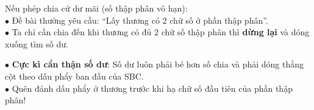 \documentclass[14pt,a4paper,oneside]{extbook}
\begin{document}
\noindent
\begin{minipage}[t]{0.54\textwidth}
  \begin{tcolorbox}[
    enhanced,
    title={\footnotesize\bfseries\color{white}\faRepeat\ Phép chia không bao giờ hết},
    colback=green!3!white,
    colframe=green!60!black,
    arc=2.5mm, boxrule=0.8pt, top=1.8mm, bottom=1.8mm, left=2.2mm, right=2.2mm
  ]
    \footnotesize
    Nếu phép chia cứ dư mãi (số thập phân vô hạn):\\
    $\bullet$ Đề bài thường yêu cầu: ``Lấy thương có $2$ chữ số ở phần thập phân''.\\
    $\bullet$ Ta chỉ cần chia đến khi thương có đủ $2$ chữ số thập phân thì \textbf{dừng lại} và dóng xuống tìm số dư.
  \end{tcolorbox}
\end{minipage}%
\hfill
\begin{minipage}[t]{0.44\textwidth}
  \begin{tcolorbox}[
    enhanced,
    title={\footnotesize\bfseries\color{white}\faExclamationTriangle\ Mẹo tránh bẫy trắc nghiệm},
    colback=red!2!white,
    colframe=red!70!black,
    arc=2.5mm, boxrule=0.8pt, top=1.8mm, bottom=1.8mm, left=2.2mm, right=2.2mm
  ]
    \footnotesize
    $\bullet$ \textbf{Cực kì cẩn thận số dư}: Số dư luôn phải bé hơn số chia và phải dóng thẳng cột theo dấu phẩy ban đầu của SBC.\\
    $\bullet$ Quên đánh dấu phẩy ở thương trước khi hạ chữ số đầu tiên của phần thập phân!
  \end{tcolorbox}
\end{minipage}
\end{document}
